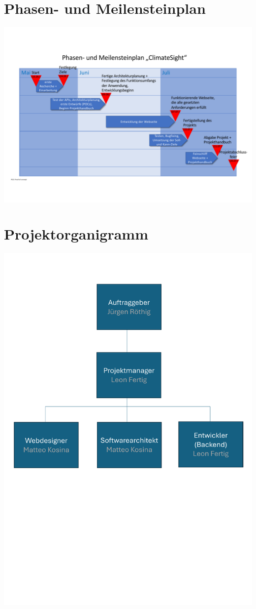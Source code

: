 \documentclass[12pt]{article}
\begin{document}
\section{Phasen- und Meilensteinplan}
\includegraphics[width=\textwidth]{Planungsdokumente/graphics/Meilensteinplan.pdf}

\section{Projektorganigramm}
\includegraphics[width=\textwidth]{Planungsdokumente/graphics/Projektorganigramm.pdf}
\end{document}
